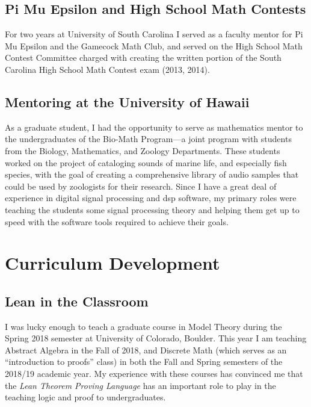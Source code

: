 \bigskip

\subsection{Pi Mu Epsilon and High School Math Contests} For two years at University of South Carolina I served as a faculty mentor for Pi Mu Epsilon and the Gamecock Math Club, and served on the High School Math Contest Committee charged with creating the written portion of the South Carolina High School Math Contest exam (2013, 2014).   

\pagestyle{fancy} 
 \lfoot{} \rfoot{\thepage} \cfoot{}

\bigskip

\subsection{Mentoring at the University of Hawaii} As a graduate student, I had the opportunity to serve as mathematics mentor to the undergraduates of the Bio-Math Program---a joint program with students from the Biology, Mathematics, and Zoology Departments.  These students worked on the project of cataloging sounds of marine life, and especially fish species, with
the goal of creating a comprehensive library of audio samples that could be used by zoologists for their research.  Since I have a great deal of experience in digital signal processing and dsp software, my primary roles were teaching the students some signal processing theory and helping them get up to speed with the software tools required to achieve their goals. 

\newpage

\pagestyle{fancy}\chead{} 
 \lfoot{} \rfoot{\thepage} \cfoot{}

\section{Curriculum Development}
\subsection{Lean in the Classroom} I was lucky enough to teach a graduate course in Model Theory during the Spring 2018 semester at University of Colorado, Boulder.  This year I am teaching Abstract Algebra in the Fall of 2018, and Discrete Math (which serves as an ``introduction to proofs'' class) in both the Fall and Spring semesters of the 2018/19 academic year.  My experience with these courses has convinced me that the \emph{Lean Theorem Proving Language} has an important role to play in the teaching logic and proof to undergraduates.

